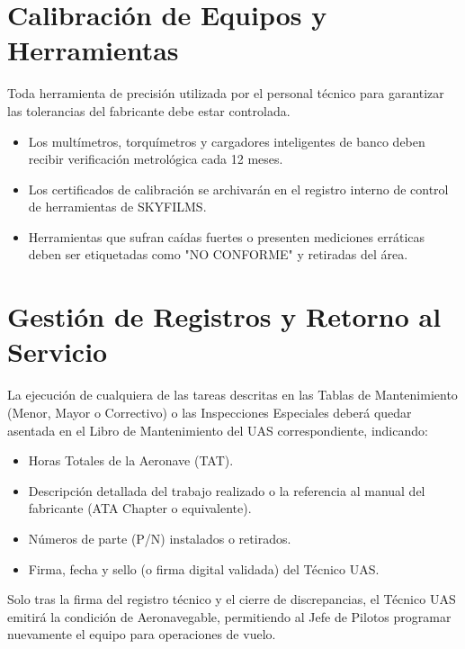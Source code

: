 \section{Calibración de Equipos y Herramientas}

Toda herramienta de precisión utilizada por el personal técnico para garantizar las tolerancias del fabricante debe estar controlada.

\begin{itemize}
    \item Los multímetros, torquímetros y cargadores inteligentes de banco deben recibir verificación metrológica cada 12 meses.

    \item Los certificados de calibración se archivarán en el registro interno de control de herramientas de SKYFILMS.

    \item Herramientas que sufran caídas fuertes o presenten mediciones erráticas deben ser etiquetadas como "NO CONFORME" y retiradas del área.
\end{itemize}

\section{Gestión de Registros y Retorno al Servicio}

La ejecución de cualquiera de las tareas descritas en las Tablas de Mantenimiento (Menor, Mayor o Correctivo) o las Inspecciones Especiales deberá quedar asentada en el Libro de Mantenimiento del UAS correspondiente, indicando:

\begin{itemize}
    \item Horas Totales de la Aeronave (TAT).

    \item Descripción detallada del trabajo realizado o la referencia al manual del fabricante (ATA Chapter o equivalente).

    \item Números de parte (P/N) instalados o retirados.

    \item Firma, fecha y sello (o firma digital validada) del Técnico UAS.
\end{itemize}

Solo tras la firma del registro técnico y el cierre de discrepancias, el Técnico UAS emitirá la condición de Aeronavegable, permitiendo al Jefe de Pilotos programar nuevamente el equipo para operaciones de vuelo.


